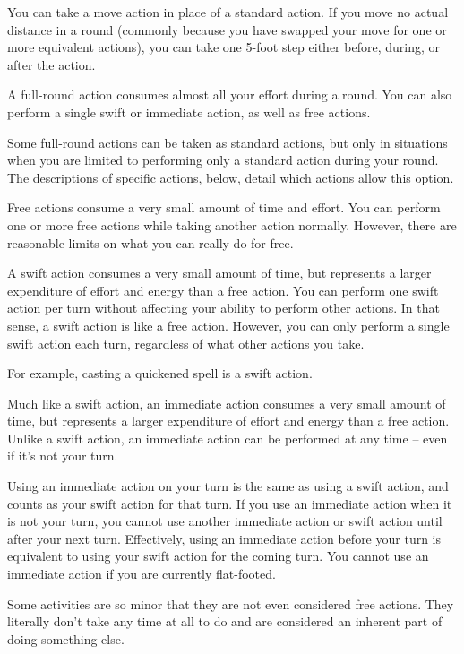 You can take a move action in place of a standard action. If you move no actual distance in a round (commonly because you have swapped your move for one or more equivalent actions), you can take one 5-foot step either before, during, or after the action.

 A full-round action consumes almost all your effort during a round. You can also perform a single swift or immediate action, as well as free actions.

Some full-round actions can be taken as standard actions, but only in situations when you are limited to performing only a standard action during your round. The descriptions of specific actions, below, detail which actions allow this option.

 Free actions consume a very small amount of time and effort. You can perform one or more free actions while taking another action normally. However, there are reasonable limits on what you can really do for free.

 A swift action consumes a very small amount of time, but represents a larger expenditure of effort and energy than a free action. You can perform one swift action per turn without affecting your ability to perform other actions. In that sense, a swift action is like a free action. However, you can only perform a single swift action each turn, regardless of what other actions you take.

For example, casting a quickened spell is a swift action.

 Much like a swift action, an immediate action consumes a very small amount of time, but represents a larger expenditure of effort and energy than a free action. Unlike a swift action, an immediate action can be performed at any time -- even if it's not your turn.

Using an immediate action on your turn is the same as using a swift action, and counts as your swift action for that turn. If you use an immediate action when it is not your turn, you cannot use another immediate action or swift action until after your next turn. Effectively, using an immediate action before your turn is equivalent to using your swift action for the coming turn. You cannot use an immediate action if you are currently flat-footed.

 Some activities are so minor that they are not even considered free actions. They literally don't take any time at all to do and are considered an inherent part of doing something else.


